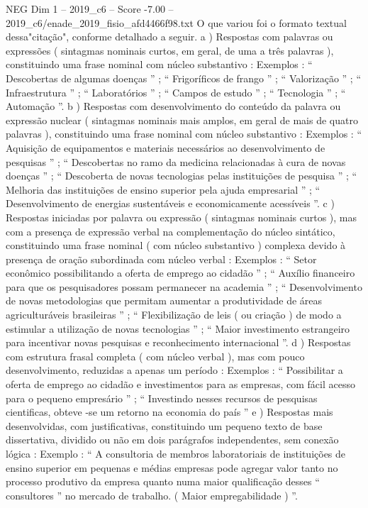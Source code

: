 \begin{textsample}{NEG Dim 1 – 2019\_c6 – Score -7.00 – 2019\_c6/enade\_2019\_fisio\_afd4466f98.txt}
O que variou foi o formato textual dessa"citação", conforme detalhado a seguir. a ) Respostas com palavras ou expressões ( sintagmas nominais curtos, em geral, de uma a três palavras ), constituindo uma frase nominal com núcleo substantivo : Exemplos : “ Descobertas de algumas doenças ” ; “ Frigoríficos de frango ” ; “ Valorização ” ; “ Infraestrutura ” ; “ Laboratórios ” ; “ Campos de estudo ” ; “ Tecnologia ” ; “ Automação ”. b ) Respostas com desenvolvimento do conteúdo da palavra ou expressão nuclear ( sintagmas nominais mais amplos, em geral de mais de quatro palavras ), constituindo uma frase nominal com núcleo substantivo : Exemplos : “ Aquisição de equipamentos e materiais necessários ao desenvolvimento de pesquisas ” ; “ Descobertas no ramo da medicina relacionadas à cura de novas doenças ” ; “ Descoberta de novas tecnologias pelas instituições de pesquisa ” ; “ Melhoria das instituições de ensino superior pela ajuda empresarial ” ; “ Desenvolvimento de energias sustentáveis e economicamente acessíveis ”. c ) Respostas iniciadas por palavra ou expressão ( sintagmas nominais curtos ), mas com a presença de expressão verbal na complementação do núcleo sintático, constituindo uma frase nominal ( com núcleo substantivo ) complexa devido à presença de oração subordinada com núcleo verbal : Exemplos : “ Setor econômico possibilitando a oferta de emprego ao cidadão ” ; “ Auxílio financeiro para que os pesquisadores possam permanecer na academia ” ; “ Desenvolvimento de novas metodologias que permitam aumentar a produtividade de áreas agriculturáveis brasileiras ” ; “ Flexibilização de leis ( ou criação ) de modo a estimular a utilização de novas tecnologias ” ; “ Maior investimento estrangeiro para incentivar novas pesquisas e reconhecimento internacional ”. d ) Respostas com estrutura frasal completa ( com núcleo verbal ), mas com pouco desenvolvimento, reduzidas a apenas um período : Exemplos : “ Possibilitar a oferta de emprego ao cidadão e investimentos para as empresas, com fácil acesso para o pequeno empresário ” ; “ Investindo nesses recursos de pesquisas cientificas, obteve -se um retorno na economia do país ” e ) Respostas mais desenvolvidas, com justificativas, constituindo um pequeno texto de base dissertativa, dividido ou não em dois parágrafos independentes, sem conexão lógica : Exemplo : “ A consultoria de membros laboratoriais de instituições de ensino superior em pequenas e médias empresas pode agregar valor tanto no processo produtivo da empresa quanto numa maior qualificação desses “ consultores ” no mercado de trabalho. ( Maior empregabilidade ) ”.

\end{textsample}
